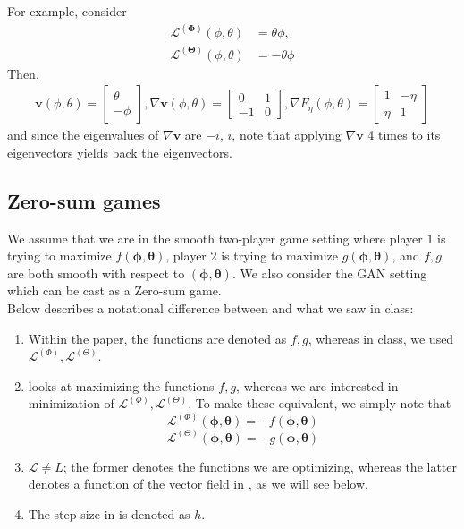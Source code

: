 \documentclass{article}
\renewcommand{\vec}[1]{\ensuremath{\boldsymbol{#1}}}
\newcommand{\ltheta}[0]{\ensuremath{\mathcal{L}^{(\boldsymbol{\Theta})}}}
\newcommand{\lphi}[0]{\ensuremath{\mathcal{L}^{(\boldsymbol{\Phi})}}}
\newcommand{\phth}[0]{\ensuremath{(\boldsymbol{\phi}, \boldsymbol{\theta})}}
\begin{document}
For example, consider 
\begin{align}
    \lphi (\phi, \theta) &= \theta \phi, \nonumber \\
    \ltheta (\phi, \theta) &= -\theta \phi
\end{align}
Then, 
\begin{align}
    \vec{v} (\phi, \theta) = \begin{bmatrix}
        \theta \\
        -\phi
    \end{bmatrix},
    \nabla \vec{v} (\phi, \theta) = \begin{bmatrix}
        0 & 1 \\
        -1 & 0
    \end{bmatrix},
    \nabla F_\eta(\phi, \theta) = \begin{bmatrix}
        1 & -\eta \\
        \eta & 1
    \end{bmatrix}
\end{align}
and since the eigenvalues of $\nabla\vec{v}$ are $-i$, $i$, note that applying $\nabla\vec{v}$ 4 times to its eigenvectors yields back the eigenvectors.

\subsection{Zero-sum games}
We assume that we are in the smooth two-player game setting where player $1$ is trying to maximize $f(\vec{\phi}, \vec{\theta})$, player $2$ is trying to maximize $g(\vec{\phi}, \vec{\theta})$, and $f,g$ are both smooth with respect to $\phth$. We also consider the GAN setting which can be cast as a Zero-sum game.
\\

Below describes a notational difference between \cite{MeschederNG17a} and what we saw in class:

\begin{enumerate}
    \item Within the paper, the functions are denoted as $f, g$, whereas in class, we used $\mathcal{L}^{(\Phi)}, \mathcal{L}^{(\Theta)}$. 
    \item \cite{MeschederNG17a} looks at maximizing the functions $f, g$, whereas we are interested in minimization of $\mathcal{L}^{(\Phi)}, \mathcal{L}^{(\Theta)}$. To make these equivalent, we simply note that $$\mathcal{L}^{(\Phi)}(\vec{\phi}, \vec{\theta}) = -f(\vec{\phi}, \vec{\theta})$$
    $$\mathcal{L}^{(\Theta)}(\vec{\phi}, \vec{\theta}) = -g(\vec{\phi}, \vec{\theta})$$
    \item $\mathcal{L} \neq L$; the former denotes the functions we are optimizing, whereas the latter denotes a function of the vector field in \cite{MeschederNG17a}, as we will see below.
    \item The step size in \cite{MeschederNG17a} is denoted as $h$. 
\end{enumerate}
\end{document}
